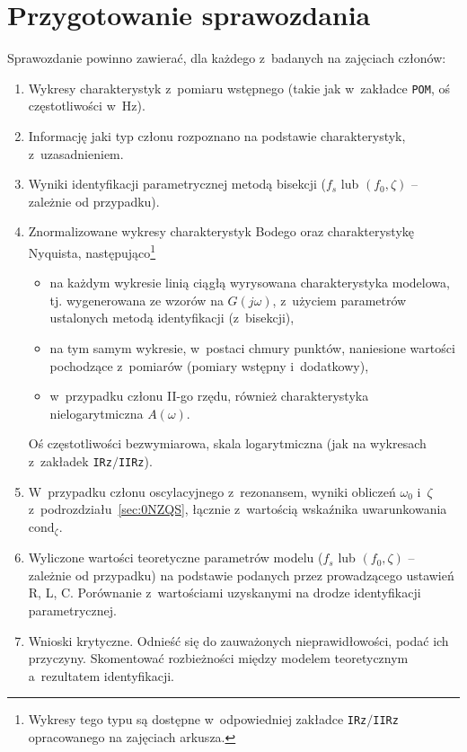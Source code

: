 \documentclass[paper=a4,DIV=12]{lpas}
\begin{document}
\section{Przygotowanie sprawozdania}
\label{sec:TFLLK}

Sprawozdanie powinno zawierać, dla każdego z~badanych na zajęciach członów:
\begin{enumerate}
  \item Wykresy charakterystyk z~pomiaru wstępnego (takie jak w~zakładce
    \texttt{POM}, oś częstotliwości w~Hz).
  \item Informację jaki typ członu rozpoznano na podstawie charakterystyk, z~uzasadnieniem.
  \item Wyniki identyfikacji parametrycznej metodą bisekcji ($f_s$ lub $(f_0, \zeta)$ -- zależnie od przypadku).
  \item Znormalizowane wykresy charakterystyk Bodego oraz charakterystykę
    Nyquista, następująco\footnote{Wykresy tego typu są dostępne w~odpowiedniej
    zakładce \texttt{IRz}$/$\texttt{IIRz} opracowanego na zajęciach arkusza.}
    \begin{itemize}
      \item na każdym wykresie linią ciągłą wyrysowana charakterystyka
        modelowa, tj. wygenerowana ze wzorów na $G(j\omega)$, z~użyciem
        parametrów ustalonych metodą identyfikacji (z~bisekcji),
      \item na tym samym wykresie, w~postaci chmury punktów, naniesione
        wartości pochodzące z~pomiarów (pomiary wstępny i~dodatkowy),
      \item w~przypadku członu II-go rzędu, również charakterystyka
        nielogarytmiczna $A(\omega)$.
    \end{itemize}
    Oś częstotliwości bezwymiarowa, skala logarytmiczna (jak na wykresach
    z~zakładek \texttt{IRz}$/$\texttt{IIRz}).
  \item W~przypadku członu oscylacyjnego z~rezonansem, wyniki obliczeń
    $\omega_0$ i~$\zeta$ z~podrozdziału~\ref{sec:0NZQS}, łącznie z~wartością
    wskaźnika uwarunkowania $\text{cond}_{\zeta}$.
  \item Wyliczone wartości teoretyczne parametrów modelu ($f_s$ lub
    $(f_0,\zeta)$ -- zależnie od przypadku) na podstawie podanych przez
    prowadzącego ustawień R, L, C. Porównanie z~wartościami uzyskanymi na
    drodze identyfikacji parametrycznej.
  \item Wnioski krytyczne. Odnieść się do zauważonych nieprawidłowości, podać
    ich przyczyny. Skomentować rozbieżności między modelem teoretycznym
    a~rezultatem identyfikacji.
\end{enumerate}
\end{document}
